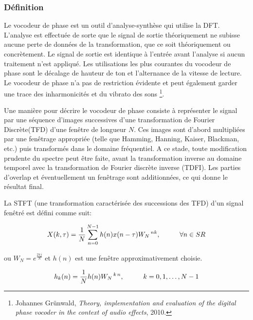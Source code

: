         \subsubsection{Définition}   

Le vocodeur de phase est un outil d'analyse-synthèse qui utilise la DFT. L'analyse est effectuée de sorte que le signal de sortie théoriquement ne subisse aucune perte de données de la transformation, que ce soit théoriquement ou concrètement. Le signal de sortie est identique à l'entrée avant l'analyse si aucun traitement n'est appliqué. Les utilisations les plus courantes du vocodeur de phase sont le décalage de hauteur de ton et l’alternance de la vitesse de lecture. Le vocodeur de phase n’a pas de restriction évidente et peut également garder une trace des inharmonicités et du vibrato des sons \footnote{Johannes Grünwald, \textit{Theory, implementation and evaluation of the digital phase vocoder in the context of audio effects}, 2010. \nocite{GR10} }.       

Une manière pour décrire le vocodeur de phase consiste à représenter le signal par une séquence d'images successives d’une transformation de Fourier Discrète(TFD) d’une fenêtre de longueur $ N$. Ces images sont d'abord multipliées par une fenêtrage appropriée (telle que Hamming, Hanning, Kaiser, Blackman, etc.) puis transformés dans le domaine fréquentiel. A ce stade, toute modification prudente du spectre peut être faite, avant la transformation inverse au domaine temporel avec la transformation de Fourier discrète inverse (TDFI). Les parties d'overlap et éventuellement un fenêtrage sont additionnées, ce qui donne le résultat final.

\vspace{0.4cm}

La STFT (une transformation caractérisée des successions des TFD) d'un signal fenêtré est défini comme suit:

\begin{equation}
    X(k, \tau) = \frac{1}{N}\sum_{ n = 0 }^{ N-1 } h(n) x(n - \tau) W_N \hspace{0.05cm}^{ n k}, \hspace{1cm} \forall n \in SR 
\end{equation}

ou \hspace{0.1cm} $ W_N = e ^ {\frac{2\pi j}{N}} $ \hspace{0.1cm} et $ h(n) $ est une fenêtre approximativement choisie.

\begin{equation}
    h_k(n) = \frac{1}{N} h(n) W_N \hspace{0.05cm} ^{k \, n},\hspace{1cm}  k = 0, 1, \dots, N - 1 
\end{equation}

